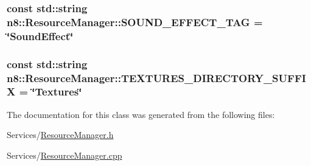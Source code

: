 \hypertarget{classn8_1_1_resource_manager_adddc8602373da08bf20c073087856f39}{
\subsubsection[{S\-O\-U\-N\-D\-\_\-\-E\-F\-F\-E\-C\-T\-\_\-\-T\-A\-G}]{\setlength{\rightskip}{0pt plus 5cm}const std\-::string n8\-::\-Resource\-Manager\-::\-S\-O\-U\-N\-D\-\_\-\-E\-F\-F\-E\-C\-T\-\_\-\-T\-A\-G = \char`\"{}Sound\-Effect\char`\"{}\hspace{0.3cm}{\ttfamily [private]}}}\label{classn8_1_1_resource_manager_adddc8602373da08bf20c073087856f39}
\hypertarget{classn8_1_1_resource_manager_af0ddf0154273d7fa5fc31f63b5ce387c}{
\subsubsection[{T\-E\-X\-T\-U\-R\-E\-S\-\_\-\-D\-I\-R\-E\-C\-T\-O\-R\-Y\-\_\-\-S\-U\-F\-F\-I\-X}]{\setlength{\rightskip}{0pt plus 5cm}const std\-::string n8\-::\-Resource\-Manager\-::\-T\-E\-X\-T\-U\-R\-E\-S\-\_\-\-D\-I\-R\-E\-C\-T\-O\-R\-Y\-\_\-\-S\-U\-F\-F\-I\-X = \char`\"{}Textures\char`\"{}\hspace{0.3cm}{\ttfamily [private]}}}\label{classn8_1_1_resource_manager_af0ddf0154273d7fa5fc31f63b5ce387c}


The documentation for this class was generated from the following files\-:\begin{DoxyCompactItemize}
\item 
Services/\hyperlink{_resource_manager_8h}{Resource\-Manager.\-h}\item 
Services/\hyperlink{_resource_manager_8cpp}{Resource\-Manager.\-cpp}\end{DoxyCompactItemize}
